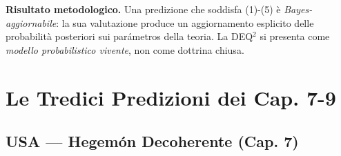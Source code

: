 \Proved{} \textbf{Risultato metodologico.} Una predizione che soddisfa
(1)-(5) è \emph{Bayes-aggiornabile}: la sua valutazione produce un
aggiornamento esplicito delle probabilità posteriori sui parámetros della
teoria. La DEQ$^2$ si presenta come \emph{modello probabilistico vivente},
non come dottrina chiusa.



\section{Le Tredici Predizioni dei Cap.
7-9}\label{le-tredici-predizioni-dei-cap.-7-9}

\subsection{USA --- Hegemón Decoherente (Cap.
7)}\label{usa-egemone-decoerente-cap.-7}

